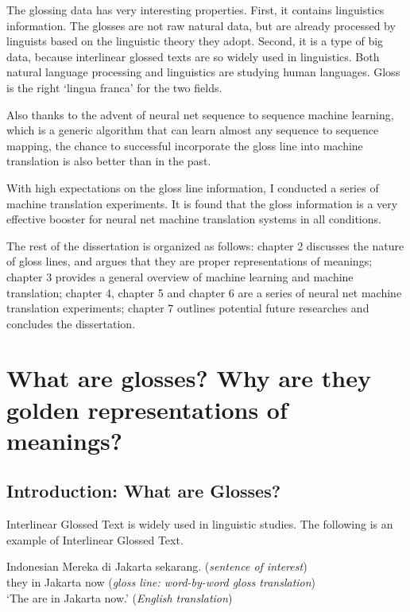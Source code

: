 \documentclass[final]{ua-thesis}
\numberwithin{equation}{section}
\begin{document}
The glossing data has very interesting properties. First, it contains linguistics information. The glosses are not raw natural data, but are already processed by linguists based on the linguistic theory they adopt. Second, it is a type of big data, because interlinear glossed texts are so widely used in linguistics.
Both natural language processing and linguistics are studying human languages. Gloss is the right `lingua franca' for the two fields. 

Also thanks to the advent of neural net sequence to sequence machine learning, which is a generic algorithm that can learn almost any sequence to sequence mapping, the chance to successful incorporate the gloss line into machine translation is also better than in the past.  

With high expectations on the gloss line information, I conducted a series of machine translation experiments. It is found that the gloss information is a very effective booster for neural net machine translation systems in all conditions. 

The rest of the dissertation is organized as follows: chapter 2 discusses the nature of gloss lines, and argues that they are proper representations of meanings; chapter 3 provides a general overview of machine learning and machine translation; chapter 4, chapter 5 and chapter 6 are a series of neural net machine translation experiments; chapter 7 outlines potential future researches and concludes the dissertation.  
\chapter{What are glosses? Why are they golden representations of meanings?}
\label{chap:gloss}

\section{Introduction: What are Glosses?}

Interlinear Glossed Text is widely used in linguistic studies. The following is an example of Interlinear Glossed Text.
\begin{exe}  
\ex\label{gloss_eg} Indonesian \citep[p. 237]{sneddon2012indonesian}
	\gll   Mereka di Jakarta sekarang. (\textit{sentence of interest})\\
     	   they in Jakarta now (\textit{gloss line: word-by-word gloss translation})\\
    \glt   `The are in Jakarta now.' (\textit{English translation})  
\end{exe}
\end{document}
